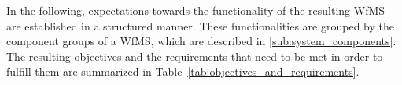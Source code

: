 
In the following, expectations towards the functionality of the resulting \ac{WfMS} are established in a structured manner. These functionalities are grouped by the component groups of a \ac{WfMS}, which are described in \ref{sub:system_components}.
The resulting objectives and the requirements that need to be met in order to fulfill them are summarized in Table~\ref{tab:objectives_and_requirements}.

